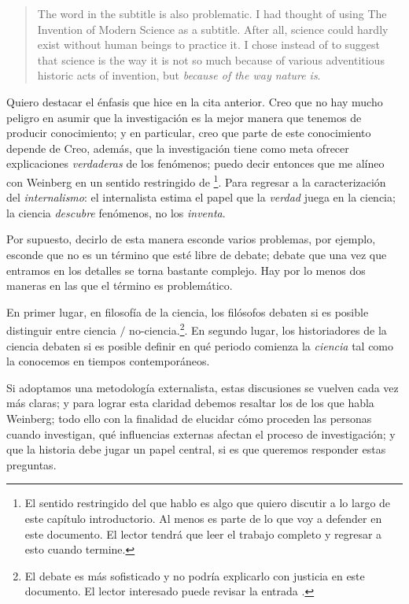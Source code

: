 	\begin{quote}
	
	The word  in the subtitle is also problematic.
	I had thought of using The Invention of Modern Science as
	a subtitle. After all, science could hardly exist without human
	beings to practice it. I chose  instead of
	 to suggest that science is the way it is not so
	much because of various adventitious historic acts of invention,
	but \emph{because of the way nature is}. \parencite[Prefacio,
	énfasis agregado]{Weinberg2015}

	\end{quote}

Quiero destacar el énfasis que hice en la cita anterior. Creo que no hay
mucho peligro en asumir que la investigación es la mejor manera que
tenemos de producir conocimiento; y en particular, creo que parte de este
conocimiento depende de  Creo,
además, que la investigación tiene como meta ofrecer explicaciones
\emph{verdaderas} de los fenómenos; puedo decir entonces que me alíneo con
Weinberg en un sentido restringido de \footnote{ El
sentido restringido del que hablo es algo que quiero discutir a lo largo
de este capítulo introductorio. Al menos es parte de lo que voy a defender
en este documento. El lector tendrá que leer el trabajo completo
y regresar a esto cuando termine.}. Para regresar a la caracterización del
\emph{internalismo}: el internalista estima el papel que la \emph{verdad}
juega en la ciencia; la ciencia \emph{descubre} fenómenos, no los
\emph{inventa}.

Por supuesto, decirlo de esta manera esconde varios problemas, por
ejemplo, esconde que  no es un término que esté libre de
debate; debate que una vez que entramos en los detalles se torna bastante
complejo. Hay por lo menos dos maneras en las que el término es
problemático.

En primer lugar, en filosofía de la ciencia, los filósofos debaten si es posible distinguir entre ciencia $/$ no-ciencia.\footnote{
	El debate es más sofisticado y no podría explicarlo con justicia en este
	documento. El lector interesado puede revisar la entrada
	\parencite{sep-pseudo-science}. 
}. 
En segundo lugar, los historiadores de la ciencia debaten si es
posible definir en qué periodo comienza la \emph{ciencia} tal como la
conocemos en tiempos contemporáneos.

Si adoptamos una metodología externalista, estas discusiones se vuelven cada vez más claras; y para lograr esta claridad debemos resaltar los  de los que habla Weinberg; todo ello con la finalidad de elucidar cómo proceden las personas cuando investigan, qué influencias externas afectan el proceso de investigación; y que la historia debe jugar un papel central, si es que queremos responder estas preguntas.

